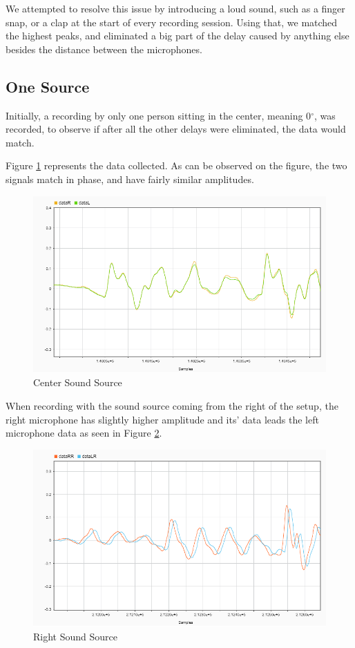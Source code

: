 We attempted to resolve this issue by introducing a loud sound, such as a finger snap, or a clap at the 
start of every recording session. Using that, we matched the highest peaks, and eliminated a big part
of the delay caused by anything else besides the distance between the microphones.

\subsection{One Source}
Initially, a recording by only one person sitting in the center, meaning 0$^\circ$, was recorded, to observe
if after all the other delays were eliminated, the data would match.

Figure \ref{fig:C} represents the data collected. As can be observed on the figure, the two signals match in
phase, and have fairly similar amplitudes.
\begin{figure}[htp]
  \centering
  \includegraphics[width=0.8\linewidth]{Illustrations/DataC.png}
  \caption{Center Sound Source}
  \label{fig:C}
\end{figure}

\newpage

When recording with the sound source coming from the right of the setup, the right microphone has slightly higher amplitude and its' data leads
the left microphone data as seen in Figure \ref{fig:R}.

\begin{figure}[htp]
  \centering
  \includegraphics[width=0.8\linewidth]{Illustrations/DataR.png}
  \caption{Right Sound Source}
  \label{fig:R}
\end{figure}

